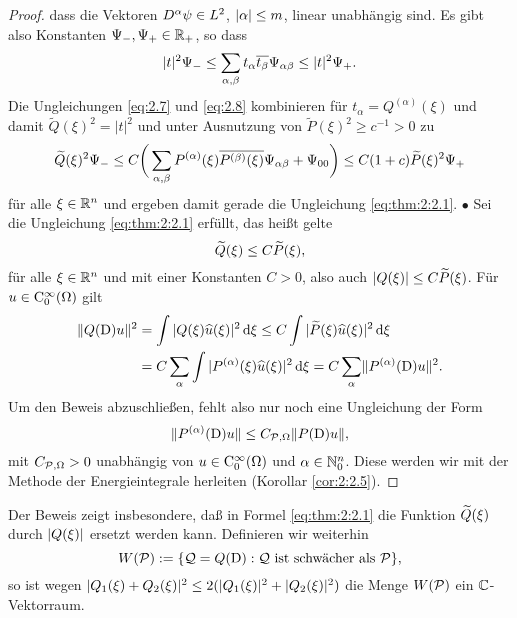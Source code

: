 \begin{proof}
dass die Vektoren $D^\alpha\psi\in L^2$, $\lvert\alpha\rvert\leq m$, linear unabhängig sind.
Es gibt also Konstanten $\Psi_-,\Psi_+\in\mathbb R_+$, so dass
\begin{equation}\label{eq:2.8}
\lvert t\rvert^2\Psi_-\leq\sum_{\alpha,\beta}t_\alpha \overline{t_\beta}\Psi_{\alpha\beta}\leq\lvert t\rvert^2\Psi_+.
\end{equation}
Die Ungleichungen \eqref{eq:2.7} und \eqref{eq:2.8} kombinieren für $t_\alpha=Q^{(\alpha)}(\xi)$ und damit $\widetilde Q(\xi)^2=|t|^2$ 
und unter Ausnutzung von $\widetilde P(\xi)^2\ge c^{-1}>0$ zu
\begin{equation}\label{eq:2.9}
\widetilde{Q}(\xi)^2 \Psi_- \le C  \bigg(\sum_{\alpha,\beta}P^{(\alpha)}(\xi)\overline{{P}^{(\beta)}(\xi)}\Psi_{\alpha\beta}+\Psi_{00}\bigg) \leq  C(1+c) \widetilde{P}(\xi)^2 \Psi_+
\end{equation}
für alle $\xi\in\mathbb R^n$ und ergeben damit gerade die Ungleichung \eqref{eq:thm:2:2.1}.
%
$\bullet$
Sei die Ungleichung \eqref{eq:thm:2:2.1} erfüllt, das heißt gelte
\begin{equation}\label{eq:2.10}
\widetilde{Q}(\xi)\leq C\widetilde{P}(\xi),
\end{equation}
für alle $\xi\in\mathbb R^n$ und mit einer Konstanten $C>0$,
also auch $\lvert Q(\xi)\rvert\leq C\widetilde{P}(\xi)$.
Für $u\in\mathrm C_0^\infty(\Omega)$ gilt
\begin{align}
\|Q(\mathrm D) u\|^2 &= \int |Q(\xi) \widehat{u}(\xi)|^2 \,\mathrm d\xi
\leq C \int |\widetilde P(\xi) \widehat{u}(\xi)|^2 \,\mathrm d\xi \notag\\&  = C\sum_\alpha\int | P^{(\alpha)}(\xi)\widehat{u}(\xi)|^2\,\mathrm d\xi = C\sum_\alpha\lVert P^{(\alpha)}(\mathrm D)u\rVert^2.\label{eq:2.11}
\end{align}
Um den Beweis abzuschließen,
fehlt also nur noch eine Ungleichung der Form
\begin{equation}
\lVert P^{(\alpha)}(\mathrm D)u\rVert\leq C_{\mathcal P,\Omega}\lVert P(\mathrm D)u\rVert, \label{eq:2:wantedineq}
\end{equation}
mit $C_{\mathcal P,\Omega}>0$ unabhängig von $u\in\mathrm C_0^\infty(\Omega)$ und $\alpha\in\mathbb N_0^n$. Diese werden wir mit der Methode der Energieintegrale herleiten (Korollar \ref{cor:2:2.5}).
\end{proof}

\begin{rem}
Der Beweis zeigt insbesondere, daß in Formel \eqref{eq:thm:2:2.1} die Funktion $\widetilde{Q}(\xi)$ durch $|Q(\xi)|$ ersetzt werden kann.
Definieren wir weiterhin
\begin{equation}
W(\mathcal P):=\{\mathcal Q=Q(\mathrm D):\mathcal Q~\text{ist schwächer als}~\mathcal P\},
\end{equation}
so ist wegen $|Q_1(\xi)+Q_2(\xi)|^2\leq2(|Q_1(\xi)|^2+|Q_2(\xi)|^2)$
die Menge $W(\mathcal P)$ ein $\mathbb C$-Vektorraum.
\end{rem}

